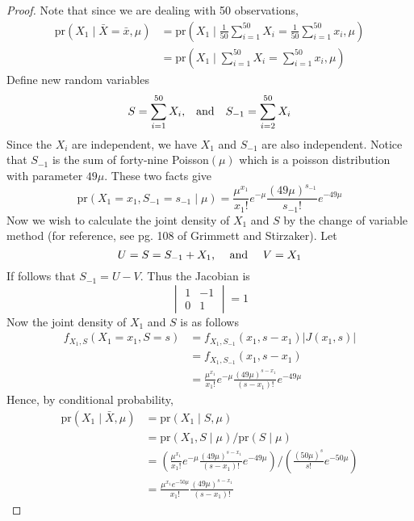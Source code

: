 \documentclass[letterpaper, 12pt]{article}\usepackage[]{graphicx}\usepackage[]{color}
\newcommand{\pr}{\text{pr}}
\newcommand{\sbs}{\;|\;} %
\begin{document}
\begin{proof}
Note that since we are dealing with 50 observations, 
\begin{align*}
\pr(X_1 \sbs \bar{X} = \bar{x}, \mu) 
&= 
\pr (X_1 \sbs \frac{1}{50}\sum_{i=1}^{50} X_i = \frac{1}{50}\sum_{i=1}^{50} x_i, \mu)
\\
&=
\pr (X_1 \sbs \sum_{i=1}^{50} X_i = \sum_{i=1}^{50} x_i, \mu)
\end{align*}
Define new random variables
\begin{equation*}
S = \sum_{i=1}^{50} X_i \text
{,\quad and\quad } 
S_{-1} = \sum_{i=2}^{50} X_i
\end{equation*}
Since the $X_i$ are independent, we have $X_1$ and $S_{-1}$ are also independent. Notice that $S_{-1}$ is the sum of forty-nine Poisson$(\mu)$ which is a poisson distribution with parameter $49 \mu$. These two facts give
\begin{equation*}
\pr(X_1 = x_1, S_{-1} = s_{-1} \sbs \mu) = 
\frac{\mu^{x_1}}{x_1!} e^{-\mu} \frac{(49\mu)^{s_{-1}}}{s_{-1}!} e^{-49\mu}
\end{equation*}
Now we wish to calculate the joint density of $X_1$ and $S$ by the change of variable method (for reference, see pg. 108 of Grimmett and Stirzaker). Let 
\begin{equation*}
U = S = S_{-1} + X_1 
\text{, \quad and \quad } 
V = X_1
\end{equation*}
If follows that $S_{-1} = U - V$. Thus the Jacobian is
\[
\begin{vmatrix}
1 & -1 \\
0 & 1
\end{vmatrix}
=
1
\]
Now the joint density of $X_1$ and $S$ is as follows
\begin{align*}
f_{X_1, S} (X_1 = x_1, S = s) 
&= f_{X_1, S_{-1}} (x_1, s - x_1) | J (x_1, s)| \\
&= f_{X_1, S_{-1}} (x_1, s - x_1) \\
&= \frac{\mu^{x_1}}{x_1!} e^{-\mu} \frac{(49\mu)^{s - x_1}}{(s-x_1)!} e^{-49\mu}
\end{align*}
Hence, by conditional probability,
\begin{align*}
\pr(X_1 \sbs \bar{X}, \mu) &= \pr (X_1 \sbs S, \mu) \\ 
&= \pr(X_1, S \sbs \mu) / \pr(S \sbs \mu) \\
&= 
\left(\frac{\mu^{x_1}}{x_1!} e^{-\mu} \frac{(49\mu)^{s - x_1}}{(s-x_1)!} e^{-49\mu} \right)
/
\left( \frac{(50\mu)^{s}}{s!} e^{-50\mu} \right) \\
&= 
\frac{\mu^{x_1} e^{-50\mu}}{x_1!} \frac{(49\mu)^{s - x_1}}{(s-x_1)!}  

\end{align*}
\end{proof}
\end{document}

